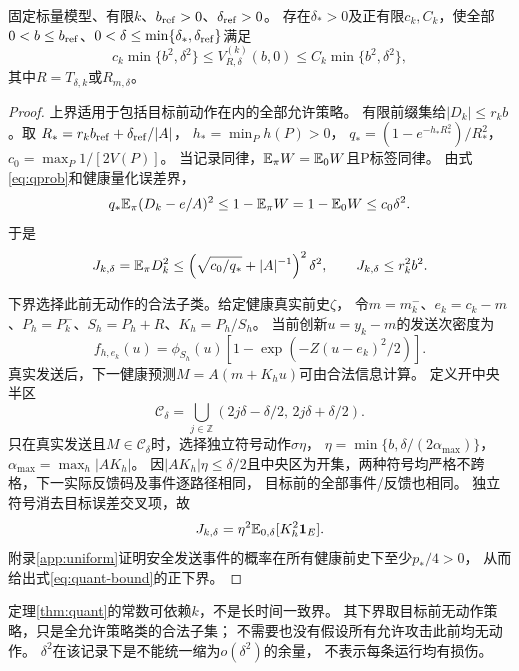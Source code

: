 \begin{theorem}[标量有限精度的零TV损伤地板]
\label{thm:quant}
固定标量模型、有限$k$、$b_{\rm ref}>0$、$\delta_{\rm ref}>0$。
存在$\delta_*>0$及正有限$c_k,C_k$，使全部
$0<b\le b_{\rm ref}$、$0<\delta\le\min\{\delta_*,\delta_{\rm ref}\}$满足
\begin{equation}
c_k\min\{b^2,\delta^2\}\le V_{R,\delta}^{(k)}(b,0)
\le C_k\min\{b^2,\delta^2\},
\label{eq:quant-bound}
\end{equation}
其中$R=T_{\delta,k}$或$R_{m,\delta}$。
\end{theorem}
\begin{proof}
上界适用于包括目标前动作在内的全部允许策略。
有限前缀集给$|D_k|\le r_kb$。取
$R_*=r_kb_{\rm ref}+\delta_{\rm ref}/|A|$，
$h_*=\min_Ph(P)>0$，
$q_*=(1-e^{-h_*R_*^2})/R_*^2$，
$c_0=\max_P1/[2V(P)]$。
当记录同律，$\mathbb E_\pi W=\mathbb E_0W$且P标签同律。
由式\eqref{eq:qprob}和健康量化误差界，
\[
q_*\mathbb E_\pi(D_k-e/A)^2\le1-\mathbb E_\pi W
=1-\mathbb E_0W\le c_0\delta^2.
\]
于是
\[
J_{k,\delta}=\mathbb E_\pi D_k^2
\le\left(\sqrt{c_0/q_*}+|A|^{-1}\right)^2\delta^2,
\qquad J_{k,\delta}\le r_k^2b^2 .
\]

下界选择此前无动作的合法子类。给定健康真实前史$\zeta$，
令$m=m_k^-$、$e_k=c_k-m$、$P_h=P_k^-$、$S_h=P_h+R$、$K_h=P_h/S_h$。
当前创新$u=y_k-m$的发送次密度为
\begin{equation}
f_{h,e_k}(u)=\phi_{S_h}(u)[1-\exp(-Z(u-e_k)^2/2)].
\label{eq:sentq}
\end{equation}
真实发送后，下一健康预测$M=A(m+K_hu)$可由合法信息计算。
定义开中央半区
\[
\mathcal C_\delta=\bigcup_{j\in\mathbb Z}
(2j\delta-\delta/2,\,2j\delta+\delta/2).
\]
只在真实发送且$M\in\mathcal C_\delta$时，选择独立符号动作$\sigma\eta$，
$\eta=\min\{b,\delta/(2\alpha_{\max})\}$，
$\alpha_{\max}=\max_h|AK_h|$。
因$|AK_h|\eta\le\delta/2$且中央区为开集，两种符号均严格不跨格，下一实际反馈码及事件逐路径相同，
目标前的全部事件/反馈也相同。
独立符号消去目标误差交叉项，故
\[
J_{k,\delta}=\eta^2\mathbb E_{0,\delta}[K_h^2\mathbf 1_E].
\]
附录\ref{app:uniform}证明安全发送事件的概率在所有健康前史下至少$p_*/4>0$，
从而给出式\eqref{eq:quant-bound}的正下界。
\end{proof}

定理\ref{thm:quant}的常数可依赖$k$，不是长时间一致界。
其下界取目标前无动作策略，只是全允许策略类的合法子集；
不需要也没有假设所有允许攻击此前均无动作。
$\delta^2$在该记录下是不能统一缩为$o(\delta^2)$的余量，
不表示每条运行均有损伤。

